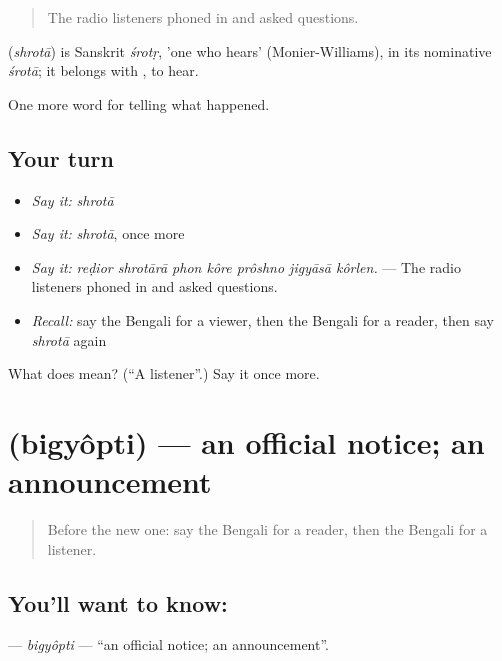 \begin{quote}
The radio listeners phoned in and asked questions.
\end{quote}

\begin{cousinweb}
\textbf{} (\emph{shrotā}) is Sanskrit \emph{śrotṛ}, 'one who hears' (Monier-Williams), in its nominative \emph{śrotā}; it belongs with \textbf{}, to hear.
\end{cousinweb}

\begin{grammarlens}[title={What you've built}]
One more word for telling what happened.
\end{grammarlens}

\subsection*{Your turn}
\begin{itemize}
\raggedright
  \item \emph{Say it:} \emph{shrotā}
  \item \emph{Say it:} \emph{shrotā}, once more
  \item \emph{Say it:} \emph{reḍior shrotārā phon kôre prôshno jigyāsā kôrlen.} — The radio listeners phoned in and asked questions.
  \item \emph{Recall:} say the Bengali for a viewer, then the Bengali for a reader, then say \emph{shrotā} again
\end{itemize}

\begin{tcolorbox}[breakable,colback=teal!4,colframe=teal!35!black,title={Before you move on}]
What does  mean? (\textquotedblleft{}A listener\textquotedblright{}.) Say it once more.
\end{tcolorbox}
\section[\texorpdfstring{\bn{বিজ্ঞপ্তি} (bigyôpti)}{বিজ্ঞপ্তি (bigyôpti)}]{ (bigyôpti) — an official notice; an announcement}

\label{lesson:BN-C300-bigyopti}



\begin{quote}
Before the new one: say the Bengali for a reader, then the Bengali for a listener.
\end{quote}

\subsection*{You'll want to know: }
\textbf{} — \emph{bigyôpti} — \textquotedblleft{}an official notice; an announcement\textquotedblright{}.

